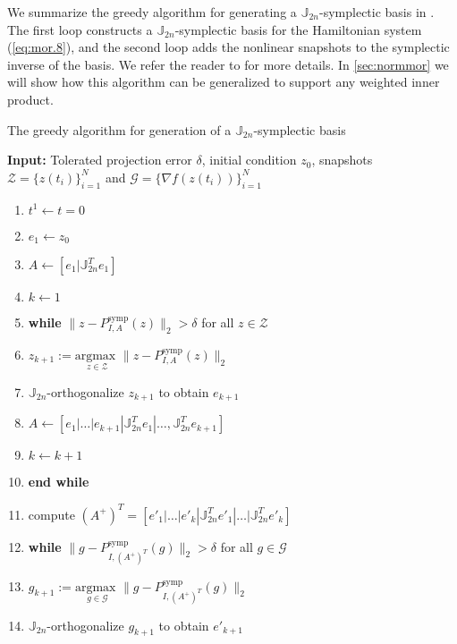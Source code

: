We summarize the greedy algorithm for generating a $\mathbb J_{2n}$-symplectic basis in . The first loop constructs a $\mathbb J_{2n}$-symplectic basis for the Hamiltonian system (\ref{eq:mor.8}), and the second loop adds the nonlinear snapshots to the symplectic inverse of the basis. We refer the reader to \cite{doi:10.1137/17M1111991} for more details. In \cref{sec:normmor} we will show how this algorithm can be generalized to support any weighted inner product.

\begin{algorithm} 
\caption{The greedy algorithm for generation of a $\mathbb J_{2n}$-symplectic basis} \label{alg:1}
{\bf Input:} Tolerated projection error $\delta$, initial condition $ z_0$, snapshots $\mathcal Z = \{ z(t_i) \}_{i=1}^{N}$ and $\mathcal G = \{ \nabla f(z(t_i)) \}_{i=1}^{N}$
\begin{enumerate}
\item $t^1 \leftarrow t=0$
\item $e_1 \leftarrow z_0$
\item $A \leftarrow [e_1|\mathbb J^T_{2n}e_1]$
\item $k \leftarrow 1$
\item \textbf{while} $\| z - P^\text{symp}_{I,A}( z ) \|_2 > \delta$ for all $z\in \mathcal Z$
\item \hspace{0.5cm} $z_{k+1} := \underset{z\in \mathcal Z}{\text{argmax }} \| z - P^\text{symp}_{I,A}( z ) \|_2$
\item \hspace{0.5cm} $\mathbb J_{2n}$-orthogonalize $ z_{k+1}$ to obtain $e_{k+1}$
\item \hspace{0.5cm} $A \leftarrow [e_1|\dots |e_{k+1} | \mathbb J^T_{2n}e_1|\dots,\mathbb J^T_{2n}e_{k+1}]$
\item \hspace{0.5cm} $k \leftarrow k+1$
\item \textbf{end while}
\item compute $(A^+)^T=[e'_1|\dots|e'_k|\mathbb J^T_{2n}e'_1|\dots|\mathbb J^T_{2n}e'_k]$
\item \textbf{while} $\| g - P^\text{symp}_{I,(A^+)^T}(g) \|_2 > \delta$ for all $g \in \mathcal G$
\item \hspace{0.5cm} $g_{k+1} := \underset{g \in \mathcal G}{\text{argmax }} \| g - P^\text{symp}_{I,(A^+)^T}(g) \|_2$
\item \hspace{0.5cm} $\mathbb J_{2n}$-orthogonalize $g_{k+1}$ to obtain $e'_{k+1}$

\end{enumerate}
\end{algorithm}
